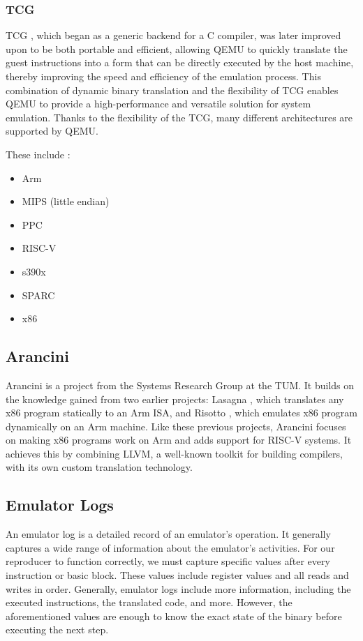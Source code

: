 \subsubsection{TCG}
\ac{TCG} \cite{qemu_tcg}, which began as a generic backend for a C compiler, was later improved upon to be both portable and efficient, allowing \ac{QEMU} to quickly translate the guest instructions into a form that can be directly executed by the host machine, thereby improving the speed and efficiency of the emulation process.
This combination of dynamic binary translation and the flexibility of \ac{TCG} enables \ac{QEMU} to provide a high-performance and versatile solution for system emulation.
Thanks to the flexibility of the \ac{TCG}, many different architectures are supported by \ac{QEMU}.

These include \cite{qemu_arch}:
\begin{itemize}
    \item Arm
    \item MIPS (little endian)
    \item PPC
    \item RISC-V
    \item s390x
    \item SPARC
    \item x86
\end{itemize}

\subsection{Arancini}
Arancini is a project from the Systems Research Group at the \ac{TUM}.
It builds on the knowledge gained from two earlier projects: Lasagna \cite{rocha2022lasagne}, which translates any x86 program statically to an Arm \ac{ISA}, and Risotto \cite{gouicem2022risotto}, which emulates x86 program dynamically on an Arm machine.
Like these previous projects, Arancini focuses on making x86 programs work on Arm and adds support for RISC-V systems.
It achieves this by combining LLVM, a well-known toolkit for building compilers, with its own custom translation technology.

\subsection{Emulator Logs}
An emulator log is a detailed record of an emulator's operation.
It generally captures a wide range of information about the emulator's activities.
For our reproducer to function correctly, we must capture specific values after every instruction or basic block.
These values include register values and all reads and writes in order.
Generally, emulator logs include more information, including the executed instructions, the translated code, and more.
However, the aforementioned values are enough to know the exact state of the binary before executing the next step.

